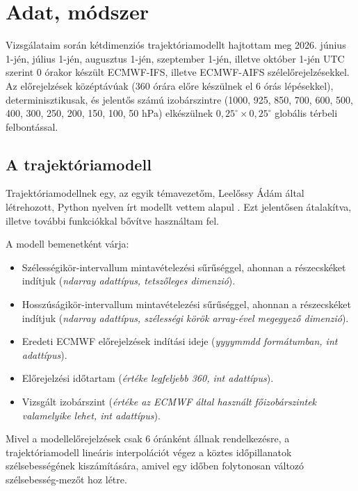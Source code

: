\documentclass[12pt,a4paper]{article}
\begin{document}
\section{Adat, módszer}
Vizsgálataim során kétdimenziós trajektóriamodellt hajtottam meg 2026. június 1-jén, július 1-jén, augusztus 1-jén, szeptember 1-jén, illetve október 1-jén UTC szerint 0 órakor készült ECMWF-IFS, illetve ECMWF-AIFS szélelőrejelzésekkel. Az előrejelzések középtávúak (360 órára előre készülnek el 6 órás lépésekkel), determinisztikusak, és jelentős számú izobárszintre (1000, 925, 850, 700, 600, 500, 400, 300, 250, 200, 150, 100, 50 hPa) elkészülnek $0,25^\circ \times 0,25^\circ$ globális térbeli felbontással.

\subsection{A trajektóriamodell}
Trajektóriamodellnek egy, az egyik témavezetőm, Leelőssy Ádám által létrehozott, Python nyelven írt modellt vettem alapul \cite{leelossy_szennyezoanyagok_2017}. Ezt jelentősen átalakítva, illetve további funkciókkal bővítve használtam fel.

A modell bemenetként várja:
\begin{itemize}
    \item Szélességikör-intervallum mintavételezési sűrűséggel, ahonnan a részecskéket indítjuk (\textit{ndarray adattípus, tetszőleges dimenzió}).
    \item Hosszúságikör-intervallum mintavételezési sűrűséggel, ahonnan a részecskéket indítjuk (\textit{ndarray adattípus, szélességi körök array-ével megegyező dimenzió}).
    \item Eredeti ECMWF előrejelzések indítási ideje (\textit{yyyymmdd formátumban, int adattípus}).
    \item Előrejelzési időtartam (\textit{értéke legfeljebb 360, int adattípus}).
    \item Vizsgált izobárszint (\textit{értéke az ECMWF által használt főizobárszintek valamelyike lehet, int adattípus}).
\end{itemize}

Mivel a modellelőrejelzések csak 6 óránként állnak rendelkezésre, a trajektóriamodell lineáris interpolációt végez a köztes időpillanatok szélsebességének kiszámítására, amivel egy időben folytonosan változó szélsebesség-mezőt hoz létre.
\end{document}
